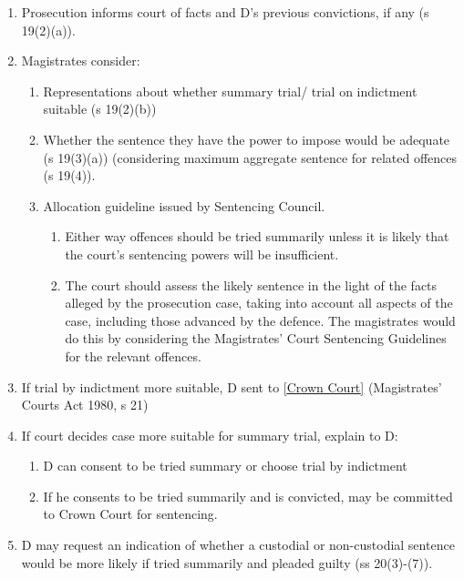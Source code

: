 \documentclass[
]{article}
\providecommand{\tightlist}{%
  \setlength{\itemsep}{0pt}\setlength{\parskip}{0pt}}
\begin{document}
\begin{enumerate}
\def\labelenumi{\arabic{enumi}.}
\tightlist
\item
  Prosecution informs court of facts and D's previous convictions, if
  any (s 19(2)(a)).
\item
  Magistrates consider:

  \begin{enumerate}
  \def\labelenumii{\arabic{enumii}.}
  \tightlist
  \item
    Representations about whether summary trial/ trial on indictment
    suitable (s 19(2)(b))
  \item
    Whether the sentence they have the power to impose would be adequate
    (s 19(3)(a)) (considering maximum aggregate sentence for related
    offences (s 19(4)).
  \item
    Allocation guideline issued by Sentencing Council.

    \begin{enumerate}
    \def\labelenumiii{\arabic{enumiii}.}
    \tightlist
    \item
      Either way offences should be tried summarily unless it is likely
      that the court's sentencing powers will be insufficient.
    \item
      The court should assess the likely sentence in the light of the
      facts alleged by the prosecution case, taking into account all
      aspects of the case, including those advanced by the defence. The
      magistrates would do this by considering the Magistrates' Court
      Sentencing Guidelines for the relevant offences.
    \end{enumerate}
  \end{enumerate}
\item
  If trial by indictment more suitable, D sent to
  \href{no\%20financial\%20limit.}{{[}Crown Court{]}} (Magistrates'
  Courts Act 1980, s 21)
\item
  If court decides case more suitable for summary trial, explain to D:

  \begin{enumerate}
  \def\labelenumii{\arabic{enumii}.}
  \tightlist
  \item
    D can consent to be tried summary or choose trial by indictment
  \item
    If he consents to be tried summarily and is convicted, may be
    committed to Crown Court for sentencing.
  \end{enumerate}
\item
  D may request an indication of whether a custodial or non-custodial
  sentence would be more likely if tried summarily and pleaded guilty
  (ss 20(3)-(7)).


\end{enumerate}
\end{document}
